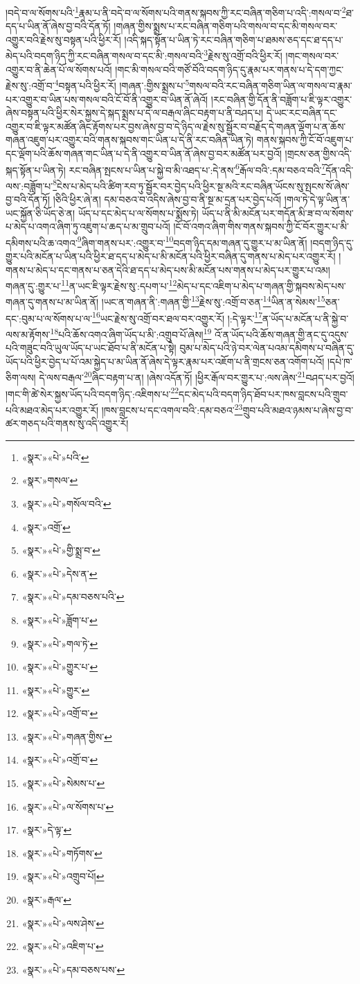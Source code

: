 །བདེ་བ་ལ་སོགས་པའི་\footnote{«སྣར་»«པེ་»པའི་}རྣམ་པ་ནི་བདེ་བ་ལ་སོགས་པའི་གནས་སྐབས་ཀྱི་རང་བཞིན་གཅིག་པ་འདི་:གསལ་བ་\footnote{«སྣར་»གསལ་}ཐ་དད་པ་ཡིན་ནོ་ཞེས་བྱ་བའི་དོན་ཏོ། །གཞན་གྱིས་སྨྲས་པ་རང་བཞིན་གཅིག་པའི་གསལ་བ་དང་མི་གསལ་བར་འགྱུར་བའི་རྗེས་སུ་བསྟན་པའི་ཕྱིར་རོ། །འདི་སྐད་སྟོན་པ་ཡིན་ཏེ་རང་བཞིན་གཅིག་པ་ཐམས་ཅད་དང་ཐ་དད་པ་མེད་པའི་བདག་ཉིད་ཀྱི་རང་བཞིན་གསལ་བ་དང་མི་:གསལ་བའི་\footnote{«སྣར་»«པེ་»གསོལ་བའི་}རྗེས་སུ་འགྲོ་བའི་ཕྱིར་རོ། །གང་གསལ་བར་འགྱུར་བ་ནི་ཆེན་པོ་ལ་སོགས་པའོ། །གང་མི་གསལ་བའི་གཙོ་བོའི་བདག་ཉིད་དུ་རྣམ་པར་གནས་པ་དེ་དག་ཀྱང་རྗེས་སུ་:འགྲོ་བ་\footnote{«སྣར་»འགྲོ་}བསྟན་པའི་ཕྱིར་རོ། །གཞན་:གྱིས་སྨྲས་པ་\footnote{«སྣར་»«པེ་»གྱི་སྨྲ་བ་}གསལ་བའི་རང་བཞིན་གཅིག་ཡིན་ལ་གསལ་བ་རྣམ་པར་འགྱུར་བ་ཡིན་པས་གསལ་བའི་ངོ་བོ་ནི་འགྱུར་བ་ཡིན་ནོ་ཞེའོ། །རང་བཞིན་གྱི་དོན་ནི་བཟློག་པ་ཇི་ལྟར་འགྱུར་ཞེས་བསྟན་པའི་ཕྱིར་སེར་སྐྱས་དེ་སྐད་སྨྲས་པ་དེ་ལ་བརྒལ་ཞིང་བརྟག་པ་ནི་བཤད་པ། དེ་ཡང་རང་བཞིན་དང་འགྱུར་བ་ཇི་ལྟར་མཚོན་ཞིང་རྟོགས་པར་བྱས་ཞེས་བྱ་བ་དེ་ཉིད་ལ་རྗེས་སུ་སྦྱོར་བ་བརྗོད་དེ་གཞན་ལྡོག་པ་ན་ཆོས་གཞན་འཇུག་པར་འགྱུར་བའི་གནས་སྐབས་གང་ཡིན་པ་དེ་ནི་རང་བཞིན་ཡིན་ཏེ། གནས་སྐབས་ཀྱི་ངོ་བོ་འཇུག་པ་དང་ལྡོག་པའི་ཆོས་གཞན་གང་ཡིན་པ་དེ་ནི་འགྱུར་བ་ཡིན་ནོ་ཞེས་བྱ་བར་མཚོན་པར་བྱའོ། །གྲངས་ཅན་གྱིས་འདི་སྐད་སྟོན་པ་ཡིན་ཏེ། རང་བཞིན་སྤངས་པ་ཡིན་པ་སྐྱེ་བ་མི་འཐད་པ་:དེ་ནས་\footnote{«སྣར་»«པེ་»དེས་ན་}རྒོལ་བའི་:དམ་བཅའ་བའི་\footnote{«སྣར་»«པེ་»དམ་བཅས་པའི་}དོན་འདི་ལས་:བཟློག་པ་\footnote{«སྣར་»«པེ་»ཟློག་པ་}ངེས་པ་མེད་པའི་ཚིག་རབ་ཏུ་སྦྱོར་བར་བྱེད་པའི་ཕྱིར་སྔ་མའི་རང་བཞིན་ཡོངས་སུ་སྤངས་སོ་ཞེས་བྱ་བའི་དོན་ཏོ། །ཅིའི་ཕྱིར་ཞེ་ན། དམ་བཅའ་བ་འདིས་ཞེས་བྱ་བ་ནི་སྔ་མ་དྲན་པར་བྱེད་པའོ། །གལ་ཏེ་དེ་ལྟ་ཡིན་ན་ཡང་སྐྱོན་ཅི་ཡོད་ཅེ་ན། ཡོད་པ་དང་མེད་པ་ལ་སོགས་པ་སྨོས་ཏེ། ཡོད་པ་ནི་མི་མངོན་པར་གདོན་མི་ཟ་བ་ལ་སོགས་པ་མེད་པ་འགའ་ཞིག་ཏུ་འཇུག་པ་ཆད་པ་མ་གྲུབ་པའོ། །ངོ་བོ་འགའ་ཞིག་གིས་གནས་སྐབས་ཀྱི་ངོ་བོར་གྱུར་པ་མི་དམིགས་པའི་ཆ་འགའ་\footnote{«སྣར་»«པེ་»གལ་ཏེ་}ཞིག་གནས་པར་:འགྱུར་བ་\footnote{«སྣར་»«པེ་»གྱུར་པ་}བདག་ཉིད་དམ་གཞན་དུ་གྱུར་པ་མ་ཡིན་ནོ། །བདག་ཉིད་དུ་གྱུར་པའི་མངོན་པ་ཡིན་པའི་ཕྱིར་ཐ་དད་པ་མེད་པ་མི་མངོན་པའི་ཕྱིར་བཞིན་དུ་གནས་པ་མེད་པར་འགྱུར་རོ། །གནས་པ་མེད་པ་དང་གནས་པ་ཅན་དེའི་ཐ་དད་པ་མེད་པས་མི་མངོན་པས་གནས་པ་མེད་པར་གྱུར་པ་འམ། གཞན་དུ་:གྱུར་པ་\footnote{«སྣར་»«པེ་»གྱུར་}ན་ཡང་ཇི་ལྟར་རྗེས་སུ་:དཔག་པ་\footnote{«སྣར་»«པེ་»འགྲོ་བ་}མེད་པ་དང་འཇིག་པ་མེད་པ་གཞན་གྱི་སྐབས་མེད་པས་གཞན་དུ་གནས་པ་མ་ཡིན་ནོ། །ཡང་ན་གཞན་ནི་:གཞན་གྱི་\footnote{«སྣར་»«པེ་»གཞན་གྱིས་}རྗེས་སུ་:འགྲོ་བ་ཅན་\footnote{«སྣར་»«པེ་»འགྲོ་བ་}ཡིན་ན་སེམས་\footnote{«སྣར་»«པེ་»སེམས་པ་}ཅན་དང་:བུམ་པ་ལ་སོགས་པ་ལ་\footnote{«སྣར་»«པེ་»ལ་སོགས་པ་}ཡང་རྗེས་སུ་འགྲོ་བར་ཐལ་བར་འགྱུར་རོ། །:དེ་ལྟར་\footnote{«སྣར་»དེ་ལྟ་}ན་ཡོད་པ་མངོན་པ་ནི་སྐྱེ་བ་ལས་མ་རྟོགས་\footnote{«སྣར་»«པེ་»གཏོགས་}པའི་ཆོས་འགའ་ཞིག་ཡོད་པ་མི་:འགྲུབ་པོ་ཞེས།\footnote{«སྣར་»«པེ་»འགྲུབ་པོ།} འོ་ན་ཡོད་པའི་ཆོས་གཞན་གྱི་ནང་དུ་འདུས་པའི་གཟུང་བའི་ཡུལ་ཡོད་པ་ཡང་ཐོབ་པ་ནི་མངོན་པ་སྟེ། བུམ་པ་མེད་པའི་ཉེ་བར་ལེན་པའམ་དམིགས་པ་བཞིན་དུ་ཡོད་པའི་ཕྱིར་བྱེད་པ་པོ་འམ་སྐྱེད་པ་མ་ཡིན་ནོ་ཞེས་དེ་ལྟར་རྣམ་པར་འཇོག་པ་ནི་གྲངས་ཅན་འགོག་པའོ། །དཔེ་ཁ་ཅིག་ལས། དེ་ལས་བརྒལ་\footnote{«སྣར་»རྒལ་}ཞིང་བརྟག་པ་ན། །ཞེས་འདོན་ཏོ། །ཕྱིར་རྒོལ་བར་གྱུར་པ་:ལས་ཞེས་\footnote{«སྣར་»«པེ་»ལས་ཤེས་}བཤད་པར་བྱའོ། །གང་གི་ཚེ་སེར་སྐྱས་ཡོད་པའི་བདག་ཉིད་:འཇིགས་པ་\footnote{«སྣར་»«པེ་»འཇིག་པ་}དང་མེད་པའི་བདག་ཉིད་ཐོབ་པར་ཁས་བླངས་པའི་གྲུབ་པའི་མཐའ་མེད་པར་འགྱུར་རོ། །ཁས་བླངས་པ་དང་འགལ་བའི་:དམ་བཅའ་\footnote{«སྣར་»«པེ་»དམ་བཅས་པས་}གྲུབ་པའི་མཐའ་ཉམས་པ་ཞེས་བྱ་བ་ཚར་གཅད་པའི་གནས་སུ་འདི་འགྱུར་རོ། 